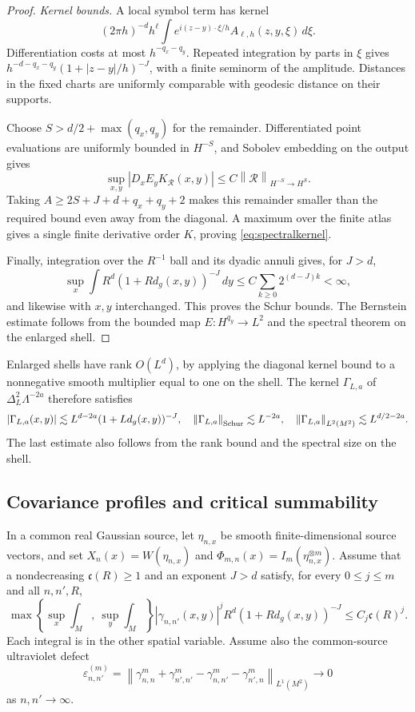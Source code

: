 \documentclass[11pt,a4paper]{amsart}
\numberwithin{equation}{section}
\theoremstyle{definition}
\theoremstyle{remark}
\newcommand{\norm}[1]{\left\lVert#1\right\rVert}
\begin{document}
\begin{proof}
\emph{Kernel bounds.} A local symbol term has kernel
\[
 (2\pi h)^{-d}h^\ell\int e^{i(z-y)\cdot\xi/h}A_{\ell,h}(z,y,\xi)\,d\xi.
\]
Differentiation costs at most $h^{-q_x-q_y}$. Repeated integration by parts in $\xi$ gives
$h^{-d-q_x-q_y}(1+|z-y|/h)^{-J}$,
with a finite seminorm of the amplitude. Distances in the fixed charts are uniformly comparable with geodesic distance on their supports.

Choose $S>d/2+\max(q_x,q_y)$ for the remainder. Differentiated point evaluations are uniformly bounded in $H^{-S}$, and Sobolev embedding on the output gives
\[
 \sup_{x,y}|D_xE_yK_{\mathcal R}(x,y)|
 \le C\norm{\mathcal R}_{H^{-S}\to H^S}.
\]
Taking $A\ge2S+J+d+q_x+q_y+2$ makes this remainder smaller than the required bound even away from the diagonal. A maximum over the finite atlas gives a single finite derivative order $K$, proving \eqref{eq:spectralkernel}.

Finally, integration over the $R^{-1}$ ball and its dyadic annuli gives, for $J>d$,
\[
 \sup_x\int R^d(1+Rd_g(x,y))^{-J}\,dy
 \le C\sum_{k\ge0}2^{(d-J)k}<\infty,
\]
and likewise with $x,y$ interchanged. This proves the Schur bounds. The Bernstein estimate follows from the bounded map $E:H^{q_y}\to L^2$ and the spectral theorem on the enlarged shell.
\end{proof}

Enlarged shells have rank $O(L^d)$, by applying the diagonal kernel bound to a nonnegative smooth multiplier equal to one on the shell. The kernel $\Gamma_{L,a}$ of $\Delta_L^2\Lambda^{-2a}$ therefore satisfies
\begin{equation}\label{eq:columnkernel}
 |\Gamma_{L,a}(x,y)|\lesssim L^{d-2a}(1+Ld_g(x,y))^{-J},\quad
 \norm{\Gamma_{L,a}}_{\rm Schur}\lesssim L^{-2a},\quad
 \norm{\Gamma_{L,a}}_{L^2(M^2)}\lesssim L^{d/2-2a}.
\end{equation}
The last estimate also follows from the rank bound and the spectral size on the shell.

\subsection{Covariance profiles and critical summability}
In a common real Gaussian source, let $\eta_{n,x}$ be smooth finite-dimensional source vectors, and set
$X_n(x)=W(\eta_{n,x})$ and $\Phi_{m,n}(x)=I_m(\eta_{n,x}^{\otimes m})$.
Assume that a nondecreasing $\mathfrak c(R)\ge1$ and an exponent $J>d$ satisfy, for every $0\le j\le m$ and all $n,n',R$,
\begin{equation}\label{eq:covprofileassumption}
 \max\left\{\sup_x\int_M,\ \sup_y\int_M\right\}
 |\gamma_{n,n'}(x,y)|^jR^d(1+Rd_g(x,y))^{-J}
 \le C_j\mathfrak c(R)^j.
\end{equation}
Each integral is in the other spatial variable. Assume also the common-source ultraviolet defect
\begin{equation}\label{eq:UVdefect}
 \varepsilon_{n,n'}^{(m)}=
 \norm{\gamma_{n,n}^m+\gamma_{n',n'}^m-\gamma_{n,n'}^m-\gamma_{n',n}^m}_{L^1(M^2)}
 \longrightarrow0
\end{equation}
as $n,n'\to\infty$.
\end{document}
